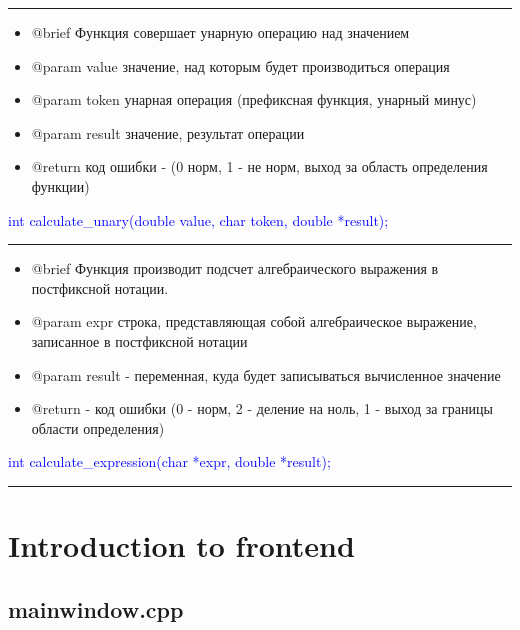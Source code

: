 \documentclass{article}
\begin{document}
                     
                     {\color{red} \rule{\linewidth}{0.5mm}}


\begin{itemize}
\item @brief Функция совершает унарную операцию над значением

\item @param value значение, над которым будет производиться операция

\item @param token унарная операция (префиксная функция, унарный минус)

\item @param result значение, результат операции

\item @return код ошибки - (0 норм, 1 - не норм, выход за область определения функции)
\end{itemize}

\textcolor{blue}{int calculate\_unary(double value, char token, double *result);}


{\color{red} \rule{\linewidth}{0.5mm}}

\begin{itemize}
\item @brief Функция производит подсчет алгебраического выражения в постфиксной нотации.

\item @param expr строка, представляющая собой алгебраическое выражение, записанное в постфиксной нотации

\item @param result - переменная, куда будет записываться вычисленное значение

\item @return - код ошибки (0 - норм, 2 - деление на ноль, 1 - выход за границы области определения)
\end{itemize}

\textcolor{blue}{int calculate\_expression(char *expr, double *result);}


{\color{red} \rule{\linewidth}{0.5mm}}

\section{Introduction to frontend}

\subsection{\textbf{mainwindow.cpp}}
\end{document}
